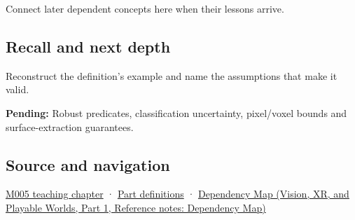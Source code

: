 \hypertarget{appendix-c80db39080be-used-by}{}

Connect later dependent concepts here when their lessons arrive.

\subsection{Recall and next depth}\label{appendix-c80db39080be-recall-and-next-depth}

\hypertarget{appendix-c80db39080be-recall-and-next-depth}{}

Reconstruct the definition's example and name the assumptions that make it valid.

\textbf{Pending:} Robust predicates, classification uncertainty, pixel/voxel bounds and surface-extraction guarantees.

\subsection{Source and navigation}\label{appendix-c80db39080be-source-and-navigation}

\hypertarget{appendix-c80db39080be-source-and-navigation}{}

\hyperref[01-foundations-i-ch001-when-arithmetic-meets-uncertainty]{M005 teaching chapter} · \hyperref[appendix-fd090d982a15-m005---parts-77-88]{Part definitions} · \href{../07-Vision-XR-and-Playable-Worlds-P01/main.pdf\#nameddest=appendix-4ad47bdd269a}{Dependency Map (Vision, XR, and Playable Worlds, Part 1, Reference notes: Dependency Map)}
